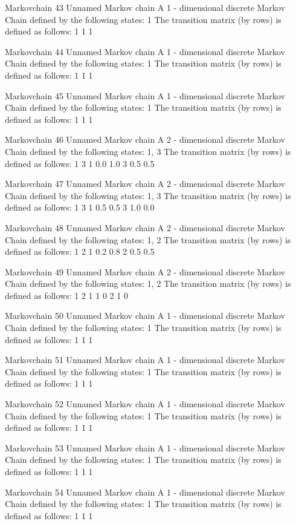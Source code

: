 \documentclass[
  nojss]{jss}
\begin{document}
\begin{CodeChunk}
\begin{CodeOutput}
Markovchain  43 
Unnamed Markov chain 
 A  1 - dimensional discrete Markov Chain defined by the following states: 
 1 
 The transition matrix  (by rows)  is defined as follows: 
  1
1 1

Markovchain  44 
Unnamed Markov chain 
 A  1 - dimensional discrete Markov Chain defined by the following states: 
 1 
 The transition matrix  (by rows)  is defined as follows: 
  1
1 1

Markovchain  45 
Unnamed Markov chain 
 A  1 - dimensional discrete Markov Chain defined by the following states: 
 1 
 The transition matrix  (by rows)  is defined as follows: 
  1
1 1

Markovchain  46 
Unnamed Markov chain 
 A  2 - dimensional discrete Markov Chain defined by the following states: 
 1, 3 
 The transition matrix  (by rows)  is defined as follows: 
    1   3
1 0.0 1.0
3 0.5 0.5

Markovchain  47 
Unnamed Markov chain 
 A  2 - dimensional discrete Markov Chain defined by the following states: 
 1, 3 
 The transition matrix  (by rows)  is defined as follows: 
    1   3
1 0.5 0.5
3 1.0 0.0

Markovchain  48 
Unnamed Markov chain 
 A  2 - dimensional discrete Markov Chain defined by the following states: 
 1, 2 
 The transition matrix  (by rows)  is defined as follows: 
    1   2
1 0.2 0.8
2 0.5 0.5

Markovchain  49 
Unnamed Markov chain 
 A  2 - dimensional discrete Markov Chain defined by the following states: 
 1, 2 
 The transition matrix  (by rows)  is defined as follows: 
  1 2
1 1 0
2 1 0

Markovchain  50 
Unnamed Markov chain 
 A  1 - dimensional discrete Markov Chain defined by the following states: 
 1 
 The transition matrix  (by rows)  is defined as follows: 
  1
1 1

Markovchain  51 
Unnamed Markov chain 
 A  1 - dimensional discrete Markov Chain defined by the following states: 
 1 
 The transition matrix  (by rows)  is defined as follows: 
  1
1 1

Markovchain  52 
Unnamed Markov chain 
 A  1 - dimensional discrete Markov Chain defined by the following states: 
 1 
 The transition matrix  (by rows)  is defined as follows: 
  1
1 1

Markovchain  53 
Unnamed Markov chain 
 A  1 - dimensional discrete Markov Chain defined by the following states: 
 1 
 The transition matrix  (by rows)  is defined as follows: 
  1
1 1

Markovchain  54 
Unnamed Markov chain 
 A  1 - dimensional discrete Markov Chain defined by the following states: 
 1 
 The transition matrix  (by rows)  is defined as follows: 
  1
1 1


\end{CodeOutput}
\end{CodeChunk}
\end{document}
